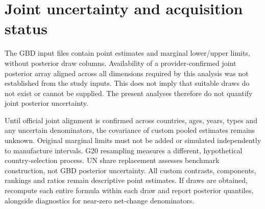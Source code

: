 \documentclass[11pt,a4paper]{article}
\begin{document}
\section{Joint uncertainty and acquisition status}
The GBD input files contain point estimates and marginal lower/upper limits, without posterior draw columns. Availability of a provider-confirmed joint posterior array aligned across all dimensions required by this analysis was not established from the study inputs. This does not imply that suitable draws do not exist or cannot be supplied. The present analyses therefore do not quantify joint posterior uncertainty.

Until official joint alignment is confirmed across countries, ages, years, types and any uncertain denominators, the covariance of custom pooled estimates remains unknown. Original marginal limits must not be added or simulated independently to manufacture intervals. G20 resampling measures a different, hypothetical country-selection process. UN share replacement assesses benchmark construction, not GBD posterior uncertainty. All custom contrasts, components, rankings and ratios remain descriptive point estimates. If draws are obtained, recompute each entire formula within each draw and report posterior quantiles, alongside diagnostics for near-zero net-change denominators.
\end{document}
